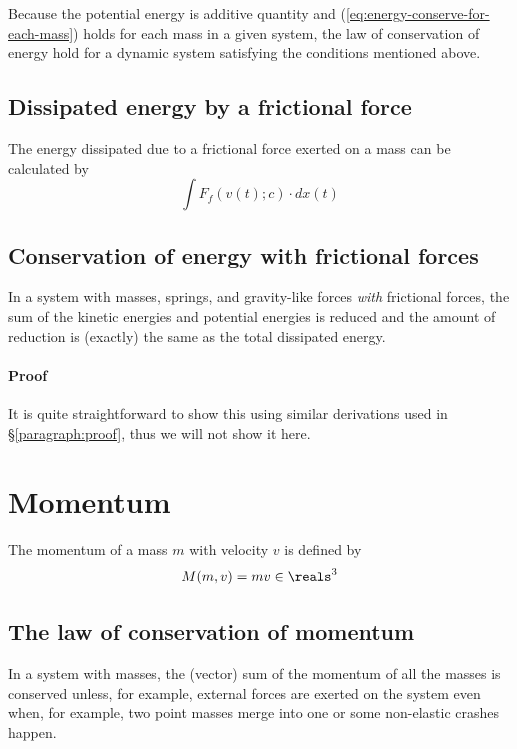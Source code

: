\documentclass{article}
\begin{document}
Because the potential energy is additive quantity
and (\ref{eq:energy-conserve-for-each-mass})
holds for each mass in a given system,
the law of conservation of energy hold
for a dynamic system satisfying the conditions mentioned above.


\subsection{Dissipated energy by a frictional force}

The energy dissipated due to a frictional force exerted on a mass
can be calculated by
\begin{equation}
\int F_f(v(t);c) \cdot dx(t)
\end{equation}

\subsection{Conservation of energy with frictional forces}

In a system with masses, springs, and gravity-like forces \emph{with} frictional forces,
the sum of the kinetic energies and potential energies is reduced
and the amount of reduction is (exactly) the same as the total dissipated energy.

\paragraph{Proof}

It is quite straightforward to show this using similar derivations
used in \S\ref{paragraph:proof},
thus we will not show it here.


\section{Momentum}

The momentum of a mass $m$ with velocity $v$ is defined by
\begin{equation}
M(m,v) = mv \in\reals^3
\end{equation}

\subsection{The law of conservation of momentum}

In a system with masses,
the (vector) sum of the momentum of all the masses
is conserved
unless, for example, external forces are exerted on the system
even when, for example, two point masses merge into one or some non-elastic crashes happen.
\end{document}
